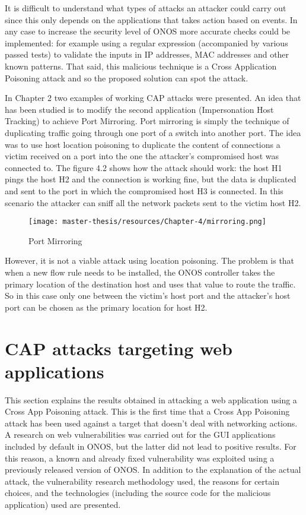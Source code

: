 \documentclass[a4paper,10pt]{memoir}
\begin{document}
It is difficult to understand what types of attacks an attacker could carry out since this only depends on the applications that takes action based on events. In any case to increase the security level of ONOS more accurate checks could be implemented: for example using a regular expression (accompanied by various passed tests) to validate the inputs in IP addresses, MAC addresses and other known patterns. That said, this malicious technique is a Cross Application Poisoning attack and so the proposed solution can spot the attack.
\medskip

In Chapter 2 two examples of working CAP attacks were presented. An idea that has been studied is to modify the second application (Impersonation Host Tracking) to achieve Port Mirroring. Port mirroring is simply the technique of duplicating traffic going through one port of a switch into another port. The idea was to use host location poisoning to duplicate the content of connections a victim received on a port into the one the attacker's compromised host was connected to. The figure 4.2 shows how the attack should work: the host H1 pings the host H2 and the connection is working fine, but the data is duplicated and sent to the port in which the compromised host H3 is connected. In this scenario the attacker can sniff all the network packets sent to the victim host H2.
\begin{figure}[h]
\caption{Port Mirroring}
\label{fig:mirroring}
\texttt{[image: master-thesis/resources/Chapter-4/mirroring.png]}
\centering
\end{figure}

However, it is not a viable attack using location poisoning. The problem is that when a new flow rule needs to be installed, the ONOS controller takes the primary location of the destination host and uses that value to route the traffic. So in this case only one between the victim's host port and the attacker's host port can be chosen as the primary location for host H2.

\clearpage


\section{CAP attacks targeting web applications}

This section explains the results obtained in attacking a web application using a Cross App Poisoning attack. This is the first time that a Cross App Poisoning attack has been used against a target that doesn't deal with networking actions. A research on web vulnerabilities was carried out for the GUI applications included by default in ONOS, but the latter did not lead to positive results. For this reason, a known and already fixed vulnerability was exploited using a previously released version of ONOS. In addition to the explanation of the actual attack, the vulnerability research methodology used, the reasons for certain choices, and the technologies (including the source code for the malicious application) used are presented.
\end{document}
